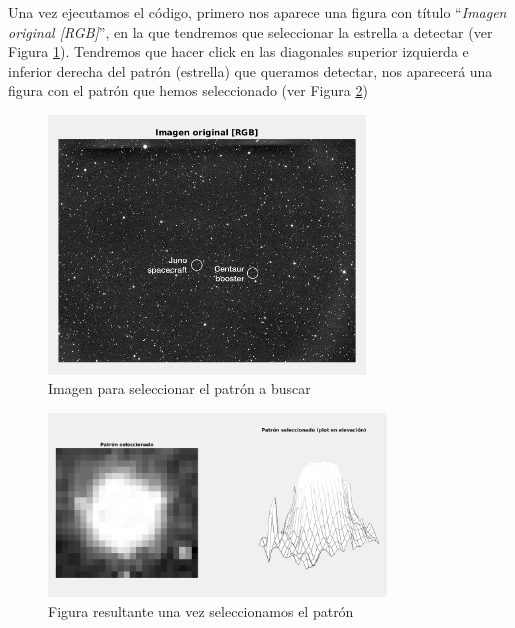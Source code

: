 \documentclass[12pt]{article}
\begin{document}
	\vspace{20px}

	\noindent Una vez ejecutamos el código, primero nos aparece una figura con título ``\textit{Imagen original [RGB]}'', en la que tendremos que seleccionar la estrella a detectar (ver Figura \ref{img: patrones 1}). Tendremos que hacer click en las diagonales superior izquierda e inferior derecha del patrón (estrella) que queramos detectar, nos aparecerá una figura con el patrón que hemos seleccionado (ver Figura \ref{img: patrones 2})
	
	\vspace{20px}
	
	\begin{figure}[h]
		\begin{center}
			\includegraphics[width=0.75\textwidth]{img/patrones_1.png}
			\caption{Imagen para seleccionar el patrón a buscar}
			\label{img: patrones 1}
		\end{center}
	\end{figure}
	
	\pagebreak
	
	\begin{figure}[h]
		\begin{center}
			\includegraphics[width=0.8\textwidth]{img/patrones_2.png}
			\caption{Figura resultante una vez seleccionamos el patrón}
			\label{img: patrones 2}
		\end{center}
	\end{figure}
\end{document}
